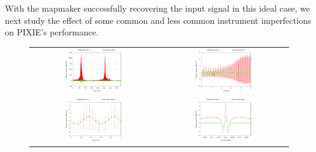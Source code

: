 \documentclass{article}
\begin{document}
With the mapmaker successfully recovering the input signal in this ideal case,
we next study the effect of some common and less common instrument
imperfections on PIXIE’s performance.
\begin{figure}
	\centering
	\begin{tabular}{cc}
		\includegraphics[width=0.48\textwidth,trim=8mm 0 0mm 0mm]{plots/tod000_full.png} &
		\includegraphics[width=0.48\textwidth,trim=8mm 0 0mm 0mm]{plots/tod000_10min.png} \\
		\includegraphics[width=0.48\textwidth,trim=8mm 0 0mm 0mm]{plots/tod000_1min.png} &
		\includegraphics[width=0.48\textwidth,trim=8mm 0 0mm 0mm]{plots/tod000_stroke.png}

\end{tabular}
\end{figure}
\end{document}
